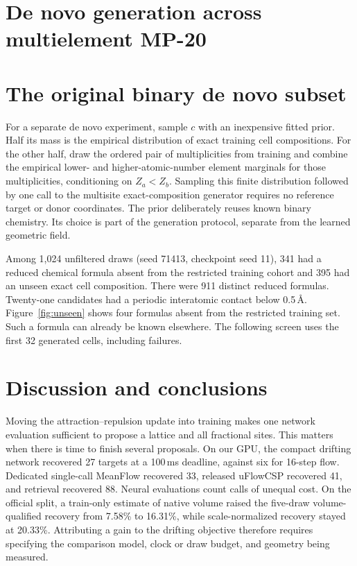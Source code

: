 \documentclass[10pt]{article}
\begin{document}


\section{De novo generation across multielement MP-20}\label{sec:multi-denovo}





\section{The original binary de novo subset}\label{sec:denovo}
For a separate de novo experiment, sample $c$ with an inexpensive fitted prior. Half its mass is the empirical distribution of exact training cell compositions. For the other half, draw the ordered pair of multiplicities from training and combine the empirical lower- and higher-atomic-number element marginals for those multiplicities, conditioning on $Z_a<Z_b$. Sampling this finite distribution followed by one call to the multisite exact-composition generator requires no reference target or donor coordinates. The prior deliberately reuses known binary chemistry. Its choice is part of the generation protocol, separate from the learned geometric field.

Among 1,024 unfiltered draws (seed 71413, checkpoint seed 11), 341 had a reduced chemical formula absent from the restricted training cohort and 395 had an unseen exact cell composition. There were 911 distinct reduced formulas. Twenty-one candidates had a periodic interatomic contact below 0.5\,\AA. Figure~\ref{fig:unseen} shows four formulas absent from the restricted training set. Such a formula can already be known elsewhere. The following screen uses the first 32 generated cells, including failures.





\section{Discussion and conclusions}
Moving the attraction--repulsion update into training makes one network evaluation sufficient to propose a lattice and all fractional sites. This matters when there is time to finish several proposals. On our GPU, the compact drifting network recovered 27 targets at a 100\,ms deadline, against six for 16-step flow. Dedicated single-call MeanFlow recovered 33, released uFlowCSP recovered 41, and retrieval recovered 88. Neural evaluations count calls of unequal cost. On the official split, a train-only estimate of native volume raised the five-draw volume-qualified recovery from 7.58\% to 16.31\%, while scale-normalized recovery stayed at 20.33\%. Attributing a gain to the drifting objective therefore requires specifying the comparison model, clock or draw budget, and geometry being measured.
\end{document}
